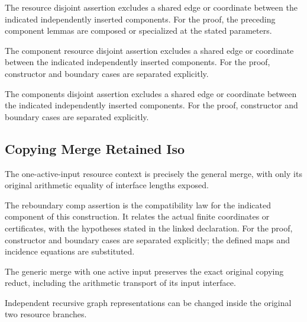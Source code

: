 The resource disjoint assertion excludes a shared edge or coordinate between the indicated independently inserted components.
For the proof, the preceding component lemmas are composed or specialized at the stated parameters.
\par{}

The component resource disjoint assertion excludes a shared edge or coordinate between the indicated independently inserted components.
For the proof, constructor and boundary cases are separated explicitly.
\par{}

The components disjoint assertion excludes a shared edge or coordinate between the indicated independently inserted components.
For the proof, constructor and boundary cases are separated explicitly.
\par{}

\subsection{Copying Merge Retained Iso}
The one-active-input resource context is precisely the general merge, with only its original arithmetic equality of interface lengths exposed.

The reboundary comp assertion is the compatibility law for the indicated component of this construction. It relates the actual finite coordinates or certificates, with the hypotheses stated in the linked declaration.
For the proof, constructor and boundary cases are separated explicitly; the defined maps and incidence equations are substituted.
\par{}

The generic merge with one active input preserves the exact original copying reduct, including the arithmetic transport of its input interface.
\par{}

Independent recursive graph representations can be changed inside the original two resource branches.
\par{}

